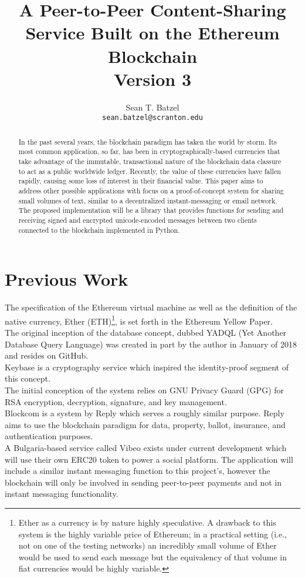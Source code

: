 \documentclass[]{article}
\title{A Peer-to-Peer Content-Sharing Service Built on the Ethereum Blockchain\\\large Version 3}
\author{Sean T. Batzel\\\texttt{sean.batzel@scranton.edu}}
\begin{document}
\maketitle
\tableofcontents

\pagebreak

\begin{abstract}
  In the past several years, the \gls{blockchain} paradigm has taken the world by storm. Its most common application, so far, has been in cryptographically-based currencies that take advantage of the immutable, transactional nature of the blockchain data classure to act as a public worldwide ledger. Recently, the value of these currencies have fallen rapidly, causing some loss of interest in their financial value. This paper aims to address other possible applications with focus on a proof-of-concept system for sharing small volumes of text, similar to a decentralized instant-messaging or email network. The proposed implementation will be a library that provides functions for sending and receiving signed and encrypted unicode-encoded messages between two clients connected to the blockchain implemented in Python.
\end{abstract}

\section{Previous Work}
The specification of the Ethereum virtual machine as well as the definition of the native currency, Ether (ETH)\footnote{Ether as a currency is by nature highly speculative. A drawback to this system is the highly variable price of Ethereum; in a practical setting (i.e., not on one of the testing networks) an incredibly small volume of Ether would be used to send each message but the equivalency of that volume in fiat currencies would be highly variable.}, is set forth in the Ethereum Yellow Paper\cite{yellowpaper}.\\
The original inception of the database concept, dubbed YADQL (Yet Another Database Query Language) was created in part by the author in January of 2018 and resides on GitHub\cite{yadql}.\\
Keybase is a cryptography service which inspired the identity-proof segment of this concept.\cite{keybase}\\
The initial conception of the system relies on GNU Privacy Guard (GPG) for RSA encryption, decryption, signature, and key management\cite{gpg}.\\
Blockcom is a system by Reply which serves a roughly similar purpose. Reply aims to use the blockchain paradigm for data, property, ballot, insurance, and authentication purposes\cite{reply}.\\
A Bulgaria-based service called Vibeo exists under current development which will use their own ERC20 token to power a social platform. The application will include a similar instant messaging function to this project's, however the blockchain will only be involved in sending peer-to-peer payments and not in instant messaging functionality\cite{vibeo}.
\end{document}
